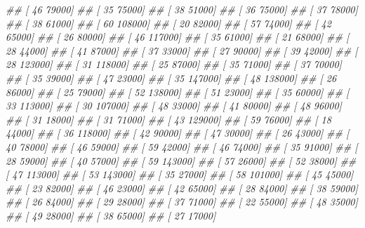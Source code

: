 \documentclass[
]{book}
\newenvironment{Shaded}{\begin{snugshade}}{\end{snugshade}}
\newcommand{\CommentTok}[1]{\textcolor[rgb]{0.56,0.35,0.01}{\textit{#1}}}
\theoremstyle{definition}
\theoremstyle{definition}
\theoremstyle{definition}
\theoremstyle{definition}
\theoremstyle{remark}
\begin{document}
\begin{Shaded}
\begin{Highlighting}[]
\CommentTok{\#\#  [    46  79000]}
\CommentTok{\#\#  [    35  75000]}
\CommentTok{\#\#  [    38  51000]}
\CommentTok{\#\#  [    36  75000]}
\CommentTok{\#\#  [    37  78000]}
\CommentTok{\#\#  [    38  61000]}
\CommentTok{\#\#  [    60 108000]}
\CommentTok{\#\#  [    20  82000]}
\CommentTok{\#\#  [    57  74000]}
\CommentTok{\#\#  [    42  65000]}
\CommentTok{\#\#  [    26  80000]}
\CommentTok{\#\#  [    46 117000]}
\CommentTok{\#\#  [    35  61000]}
\CommentTok{\#\#  [    21  68000]}
\CommentTok{\#\#  [    28  44000]}
\CommentTok{\#\#  [    41  87000]}
\CommentTok{\#\#  [    37  33000]}
\CommentTok{\#\#  [    27  90000]}
\CommentTok{\#\#  [    39  42000]}
\CommentTok{\#\#  [    28 123000]}
\CommentTok{\#\#  [    31 118000]}
\CommentTok{\#\#  [    25  87000]}
\CommentTok{\#\#  [    35  71000]}
\CommentTok{\#\#  [    37  70000]}
\CommentTok{\#\#  [    35  39000]}
\CommentTok{\#\#  [    47  23000]}
\CommentTok{\#\#  [    35 147000]}
\CommentTok{\#\#  [    48 138000]}
\CommentTok{\#\#  [    26  86000]}
\CommentTok{\#\#  [    25  79000]}
\CommentTok{\#\#  [    52 138000]}
\CommentTok{\#\#  [    51  23000]}
\CommentTok{\#\#  [    35  60000]}
\CommentTok{\#\#  [    33 113000]}
\CommentTok{\#\#  [    30 107000]}
\CommentTok{\#\#  [    48  33000]}
\CommentTok{\#\#  [    41  80000]}
\CommentTok{\#\#  [    48  96000]}
\CommentTok{\#\#  [    31  18000]}
\CommentTok{\#\#  [    31  71000]}
\CommentTok{\#\#  [    43 129000]}
\CommentTok{\#\#  [    59  76000]}
\CommentTok{\#\#  [    18  44000]}
\CommentTok{\#\#  [    36 118000]}
\CommentTok{\#\#  [    42  90000]}
\CommentTok{\#\#  [    47  30000]}
\CommentTok{\#\#  [    26  43000]}
\CommentTok{\#\#  [    40  78000]}
\CommentTok{\#\#  [    46  59000]}
\CommentTok{\#\#  [    59  42000]}
\CommentTok{\#\#  [    46  74000]}
\CommentTok{\#\#  [    35  91000]}
\CommentTok{\#\#  [    28  59000]}
\CommentTok{\#\#  [    40  57000]}
\CommentTok{\#\#  [    59 143000]}
\CommentTok{\#\#  [    57  26000]}
\CommentTok{\#\#  [    52  38000]}
\CommentTok{\#\#  [    47 113000]}
\CommentTok{\#\#  [    53 143000]}
\CommentTok{\#\#  [    35  27000]}
\CommentTok{\#\#  [    58 101000]}
\CommentTok{\#\#  [    45  45000]}
\CommentTok{\#\#  [    23  82000]}
\CommentTok{\#\#  [    46  23000]}
\CommentTok{\#\#  [    42  65000]}
\CommentTok{\#\#  [    28  84000]}
\CommentTok{\#\#  [    38  59000]}
\CommentTok{\#\#  [    26  84000]}
\CommentTok{\#\#  [    29  28000]}
\CommentTok{\#\#  [    37  71000]}
\CommentTok{\#\#  [    22  55000]}
\CommentTok{\#\#  [    48  35000]}
\CommentTok{\#\#  [    49  28000]}
\CommentTok{\#\#  [    38  65000]}
\CommentTok{\#\#  [    27  17000]}

\end{Highlighting}
\end{Shaded}
\end{document}
